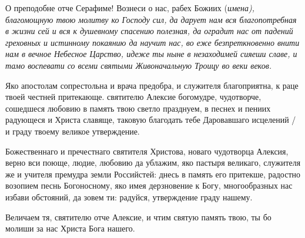 

О преподобне отче Серафиме! Вознеси о нас, рабех Божиих (\itshape имена\normalfont{}), благомощную твою молитву ко Господу сил, да дарует нам вся благопотребная в жизни сей и вся к душевному спасению полезная, да оградит нас от падений греховных и истинному покаянию да научит нас, во еже безпреткновенно внити нам в вечное Небесное Царство, идеже ты ныне в незаходимей сияеши славе, и тамо воспевати со всеми святыми Живоначальную Троицу во веки веков.
\mychapterending

 


Яко апостолам сопрестольна и врача предобра,  и служителя благоприятна,  к раце твоей честней притекающе. святителю Алексие богомудре, чудотворче,  сошедшеся любовию в память твою светло празднуем,  в песнех и пениих радующеся и Христа славяще,  таковую благодать тебе Даровавшаго исцелений / и граду твоему великое утверждение. 



Божественнаго и пречестнаго святителя Христова, новаго чудотворца Алексия, верно вси поюще, людие, любовию да ублажим, яко пастыря великаго, служителя же и учителя премудра земли Российстей: днесь в память его притекше, радостно возопием песнь Богоносному, яко имея дерзновение к Богу, многообразных нас избави обстояний, да зовем ти: радуйся, утверждение граду нашему.




Величаем тя, святителю отче Алексие, и чтим святую память твою, ты бо молиши за нас Христа Бога нашего.




